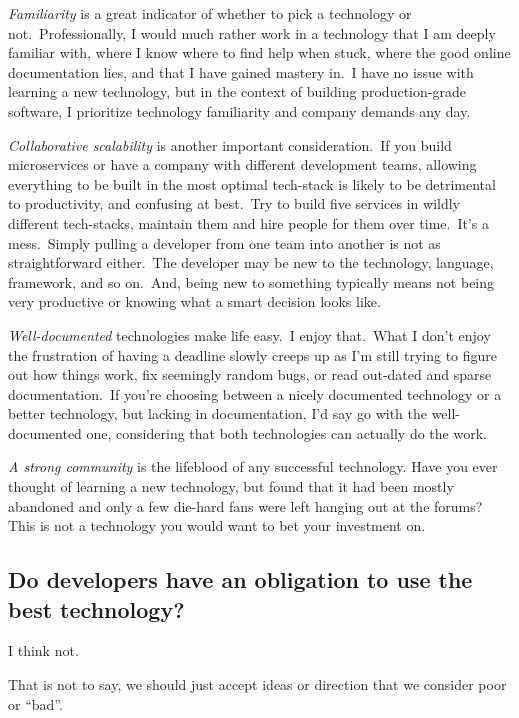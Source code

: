 \documentclass{article}
\begin{document}
    \textit{Familiarity} is a great indicator of whether to pick a technology or not.\ Professionally, I would much rather
    work in a technology that I am deeply familiar with, where I know where to find help when stuck, where the good online
    documentation lies, and that I have gained mastery in.\ I have no issue with learning a new technology, but in the context
    of building production-grade software, I prioritize technology familiarity and company demands any day.

    \textit{Collaborative scalability} is another important consideration.\ If you build microservices or have a company
    with different development teams, allowing everything to be built in the most optimal tech-stack is likely to be
    detrimental to productivity, and confusing at best.\ Try to build five services in wildly different tech-stacks, maintain
    them and hire people for them over time.\  It's a mess.\ Simply pulling a developer from one team into another is not 
    as straightforward either.\ The developer may be new to the technology, language, framework, and so on.\ And, being 
    new to something typically means not being very productive or knowing what a smart decision looks like.
    
    \textit{Well-documented} technologies make life easy.\ I enjoy that.\ What I don't enjoy the frustration of
    having a deadline slowly creeps up as I'm still trying to figure out how things work, fix seemingly random bugs, or
    read out-dated and sparse documentation.\ If you're choosing between a nicely documented technology or a better technology, but
    lacking in documentation, I'd say go with the well-documented one, considering that both technologies can actually
    do the work.

    \textit{A strong community} is the lifeblood of any successful technology. Have you ever thought of learning a
    new technology, but found that it had been mostly abandoned and only a few die-hard fans were left hanging out at 
    the forums? This is not a technology you would want to bet your investment on.

    \subsection*{\normalfont\sffamily Do developers have an obligation to use the best technology?}
    I think not.
    
    That is not to say, we should just accept ideas or direction that we consider poor or ``bad''.
    
\end{document}
